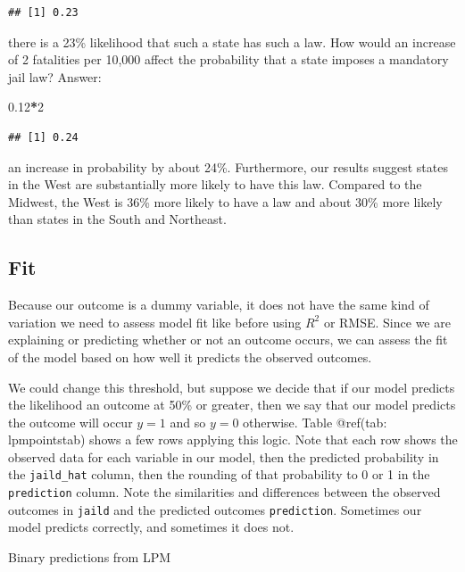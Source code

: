 \documentclass[
]{book}
\newenvironment{Shaded}{\begin{snugshade}}{\end{snugshade}}
\newcommand{\DecValTok}[1]{\textcolor[rgb]{0.00,0.00,0.81}{#1}}
\newcommand{\FloatTok}[1]{\textcolor[rgb]{0.00,0.00,0.81}{#1}}
\newcommand{\OperatorTok}[1]{\textcolor[rgb]{0.81,0.36,0.00}{\textbf{#1}}}
\begin{document}
\begin{verbatim}
## [1] 0.23
\end{verbatim}

there is a 23\% likelihood that such a state has such a law. How would an increase of 2 fatalities per 10,000 affect the probability that a state imposes a mandatory jail law? Answer:

\begin{Shaded}
\begin{Highlighting}[]
\FloatTok{0.12}\OperatorTok{*}\DecValTok{2}
\end{Highlighting}
\end{Shaded}

\begin{verbatim}
## [1] 0.24
\end{verbatim}

an increase in probability by about 24\%. Furthermore, our results suggest states in the West are substantially more likely to have this law. Compared to the Midwest, the West is 36\% more likely to have a law and about 30\% more likely than states in the South and Northeast.

\hypertarget{fit}{%
\subsection{Fit}\label{fit}}

Because our outcome is a dummy variable, it does not have the same kind of variation we need to assess model fit like before using \(R^2\) or RMSE. Since we are explaining or predicting whether or not an outcome occurs, we can assess the fit of the model based on how well it predicts the observed outcomes.

We could change this threshold, but suppose we decide that if our model predicts the likelihood an outcome at 50\% or greater, then we say that our model predicts the outcome will occur \(y=1\) and so \(y=0\) otherwise. Table @ref(tab: lpmpointstab) shows a few rows applying this logic. Note that each row shows the observed data for each variable in our model, then the predicted probability in the \texttt{jaild\_hat} column, then the rounding of that probability to 0 or 1 in the \texttt{prediction} column. Note the similarities and differences between the observed outcomes in \texttt{jaild} and the predicted outcomes \texttt{prediction}. Sometimes our model predicts correctly, and sometimes it does not.

\label{tab:lpmpointstab}Binary predictions from LPM
\end{document}
